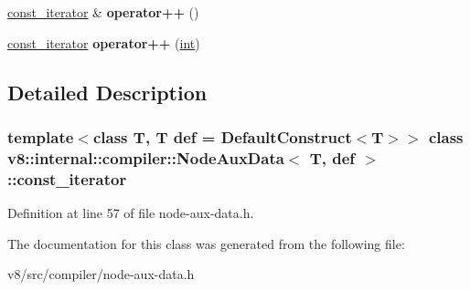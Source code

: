 \begin{DoxyCompactItemize}
\mbox{\hyperlink{classv8_1_1internal_1_1compiler_1_1NodeAuxData_1_1const__iterator}{const\+\_\+iterator}} \& {\bfseries operator++} ()
\item 
\mbox{\label{classv8_1_1internal_1_1compiler_1_1NodeAuxData_1_1const__iterator_a20fdad3c9638f6fb475100053e0e5217}} 
\mbox{\hyperlink{classv8_1_1internal_1_1compiler_1_1NodeAuxData_1_1const__iterator}{const\+\_\+iterator}} {\bfseries operator++} (\mbox{\hyperlink{classint}{int}})
\end{DoxyCompactItemize}


\subsection{Detailed Description}
\subsubsection*{template$<$class T, T  def = Default\+Construct$<$\+T$>$$>$\newline
class v8\+::internal\+::compiler\+::\+Node\+Aux\+Data$<$ T, def $>$\+::const\+\_\+iterator}



Definition at line 57 of file node-\/aux-\/data.\+h.



The documentation for this class was generated from the following file\+:\begin{DoxyCompactItemize}
\item 
v8/src/compiler/node-\/aux-\/data.\+h\end{DoxyCompactItemize}
